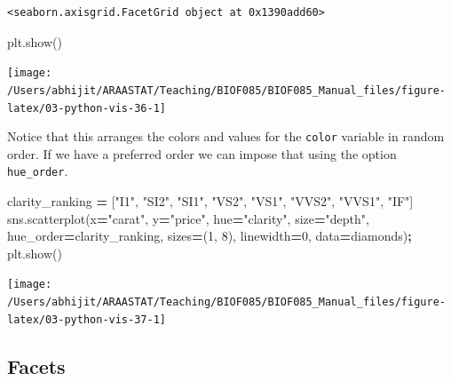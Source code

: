 \documentclass[
  letterpaper,
]{scrbook}
\newenvironment{Shaded}{\begin{snugshade}}{\end{snugshade}}
\newcommand{\DecValTok}[1]{\textcolor[rgb]{0.00,0.00,0.81}{#1}}
\newcommand{\NormalTok}[1]{#1}
\newcommand{\OperatorTok}[1]{\textcolor[rgb]{0.81,0.36,0.00}{\textbf{#1}}}
\newcommand{\StringTok}[1]{\textcolor[rgb]{0.31,0.60,0.02}{#1}}
\begin{document}
\begin{verbatim}
<seaborn.axisgrid.FacetGrid object at 0x1390add60>
\end{verbatim}

\begin{Shaded}
\begin{Highlighting}[]
\NormalTok{plt.show()}
\end{Highlighting}
\end{Shaded}

\begin{center}\texttt{[image: /Users/abhijit/ARAASTAT/Teaching/BIOF085/BIOF085\_Manual\_files/figure-latex/03-python-vis-36-1]} \end{center}

Notice that this arranges the colors and values for the \texttt{color} variable in random order. If we have a preferred order we can impose that using the option \texttt{hue\_order}.

\begin{Shaded}
\begin{Highlighting}[]
\NormalTok{clarity_ranking }\OperatorTok{=}\NormalTok{ [}\StringTok{"I1"}\NormalTok{, }\StringTok{"SI2"}\NormalTok{, }\StringTok{"SI1"}\NormalTok{, }\StringTok{"VS2"}\NormalTok{, }\StringTok{"VS1"}\NormalTok{, }\StringTok{"VVS2"}\NormalTok{, }\StringTok{"VVS1"}\NormalTok{, }\StringTok{"IF"}\NormalTok{]}
\NormalTok{sns.scatterplot(x}\OperatorTok{=}\StringTok{"carat"}\NormalTok{, y}\OperatorTok{=}\StringTok{"price"}\NormalTok{,}
\NormalTok{                hue}\OperatorTok{=}\StringTok{"clarity"}\NormalTok{, size}\OperatorTok{=}\StringTok{"depth"}\NormalTok{,}
\NormalTok{                hue_order}\OperatorTok{=}\NormalTok{clarity_ranking,}
\NormalTok{                sizes}\OperatorTok{=}\NormalTok{(}\DecValTok{1}\NormalTok{, }\DecValTok{8}\NormalTok{), linewidth}\OperatorTok{=}\DecValTok{0}\NormalTok{,}
\NormalTok{                data}\OperatorTok{=}\NormalTok{diamonds)}\OperatorTok{;}
\NormalTok{plt.show() }
\end{Highlighting}
\end{Shaded}

\begin{center}\texttt{[image: /Users/abhijit/ARAASTAT/Teaching/BIOF085/BIOF085\_Manual\_files/figure-latex/03-python-vis-37-1]} \end{center}

\hypertarget{facets}{%
\subsection{Facets}\label{facets}}
\end{document}
